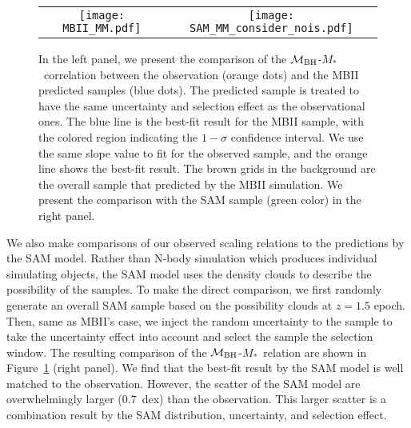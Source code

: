 \documentclass{natureprintstyle}
\newcommand{\mbh}{$\mathcal M_{\rm BH}$}
\newcommand{\mstar}{{$M_*$}}
\newcommand{\ding}[1]{\textcolor{red}{[{\bf Xuheng}: #1]}}
\begin{document}
\begin{figure*}[t]%
\begin{tabular}{c c}
\texttt{[image: MBII\_MM.pdf]} &
\texttt{[image: SAM\_MM\_consider\_nois.pdf]} \\
\end{tabular}
\caption{In the left panel, we present the comparison of the  \mbh-\mstar\ correlation between the observation (orange dots) and the MBII predicted samples (blue dots). The predicted sample is treated to have the same uncertainty and selection effect as the observational ones. The blue line is the best-fit result for the MBII sample, with the colored region indicating the $1-\sigma$ confidence interval. We use the same slope value to fit for the observed sample, and the orange line shows the best-fit result. The brown grids in the background are the overall sample that predicted by the MBII simulation. We present the comparison with the SAM sample (green color) in the right panel.
}
\label{fig:MM_comp}
\end{figure*}

We also make comparisons of our observed scaling relations to the predictions by the SAM model. Rather than N-body simulation which produces individual simulating objects, the SAM model uses the density clouds to describe the possibility of the samples. 
To make the direct comparison, we first randomly generate an overall SAM sample based on the possibility clouds at $z=1.5$ epoch. Then, same as MBII's case, we inject the random uncertainty to the sample to take the uncertainty effect into account and select the sample the selection window. The resulting comparison of the  \mbh-\mstar\ relation are shown in Figure~\ref{fig:MM_comp} (right panel). We find that the best-fit result by the SAM model is well matched to the observation. However, the scatter of the SAM model are overwhelmingly larger ($0.7$~dex) than the observation. This larger scatter is a combination result by the SAM distribution, uncertainty, and selection effect.  
\end{document}
